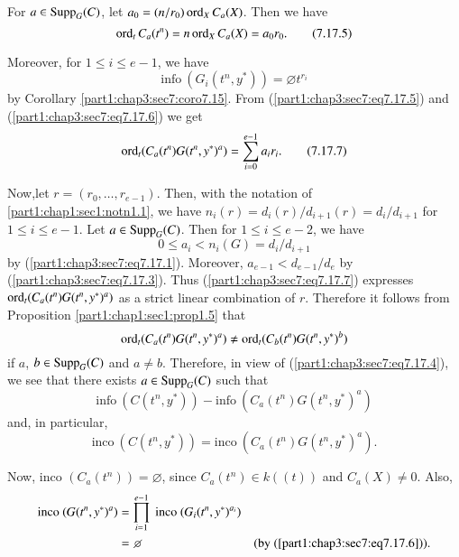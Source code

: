 For $a \in \operatorname{Supp}_G (C)$, let $a_0 = (n/r_0) \operatorname{ord}_X C_a(X)$. Then we have
\begin{equation*}
  \operatorname{ord}_t C_a (t^n) = n \operatorname{ord}_X C_a (X) = a_0 r_0.\tag{7.17.5} 
  \label{part1:chap3:sec7:eq7.17.5}
\end{equation*}

Moreover, for $1 \leq i \leq e-1$, we have
\begin{equation*}
  \text{info}~ (G_i (t^n, y^*))= \diameter t^{r_i} \tag{7.17.6}
  \label{part1:chap3:sec7:eq7.17.6}
\end{equation*}
by Corollary \ref{part1:chap3:sec7:coro7.15}. From
(\ref{part1:chap3:sec7:eq7.17.5}) and
(\ref{part1:chap3:sec7:eq7.17.6}) we get 
\begin{equation*}
  \operatorname{ord}_t (C_a (t^n) G(t^n, y^*)^a)= \sum^{e-1}_{i=0} a_i r_i. \tag{7.17.7} 
  \label{part1:chap3:sec7:eq7.17.7}
\end{equation*}

Now,\pageoriginale let $r= (r_0, \ldots , r_{e-1})$. Then, with the notation of \ref{part1:chap1:sec1:notn1.1}, we have $n_i (r) = d_i (r)/d_{i+1} (r)= d_i/d_{i+1}$ for $1 \leq i \leq e-1$. Let $a\in \operatorname{Supp}_G (C)$. Then for $1 \leq i \leq e-2$, we have 
$$
0 \leq a_i < n_i (G) = d_i /d_{i+1}
$$
by (\ref{part1:chap3:sec7:eq7.17.1}). Moreover, $a_{e-1} < d_{e-1}/d_e$ by (\ref{part1:chap3:sec7:eq7.17.3}). Thus (\ref{part1:chap3:sec7:eq7.17.7}) expresses $\operatorname{ord}_t(C_a (t^n)G(t^n, y^*)^a)$ as a strict linear combination of $r$. Therefore it follows from Proposition \ref{part1:chap1:sec1:prop1.5} that
$$
\operatorname{ord}_t (C_a (t^n) G(t^n, y^*)^a) \neq \operatorname{ord}_t (C_b(t^n)G(t^n, y^*)^b)
$$
if $a$, $b \in \operatorname{Supp}_G(C)$ and $a \neq b$. Therefore, in view of
(\ref{part1:chap3:sec7:eq7.17.4}), we see that there exists $a \in
\operatorname{Supp}_G(C)$ such that  
$$
\text{info}~ (C (t^n, y^*)) - \text{info}~ (C_a (t^n)G(t^n, y^*)^a)
$$
and, in particular,
\begin{equation*}
  \text{inco}~(C (t^n, y^*)) = \text{inco}~ (C_a (t^n) G(t^n, y^*)^a).\tag{7.17.8} \label{part1:chap3:sec7:eq7.17.8}
\end{equation*}

Now, inco $(C_a (t^n))= \diameter$, since $C_a (t^n) \in k ((t))$ and $C_a (X) \neq 0$. Also,
\begin{align*}
  \text{inco}~ (G(t^n, y^*)^a) & = \prod^{e-1}_{i=1} ~\text{inco}~ (G_i (t^n, y^*)^{a_i})& \\
  & = \diameter & (\text{by (\ref{part1:chap3:sec7:eq7.17.6})}). 
\end{align*}

